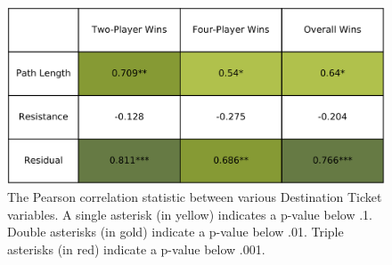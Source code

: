 \begin{figure}[!h]
    \centering
    \includegraphics[scale=.69]{figures/pearsons_table}
    \caption{The Pearson correlation statistic between
    various Destination Ticket variables.
    A single asterisk (in yellow) indicates a p-value
    below .1. Double asterisks (in gold) indicate a
    p-value below .01. Triple asterisks (in red)
    indicate a p-value below .001.}
    \label{fig:correlation_table}
\end{figure}
\begin{multicols}{2}

\end{multicols}
